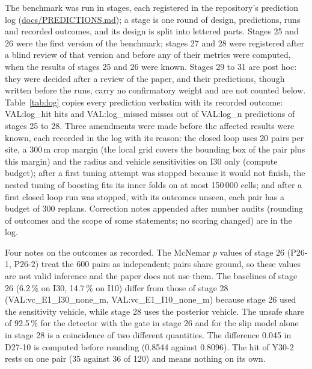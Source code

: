 The benchmark was run in stages, each registered in the repository's prediction log (\url{docs/PREDICTIONS.md}); a stage is one round of design, predictions, runs and recorded outcomes, and its design is split into lettered parts. Stages 25 and 26 were the first version of the benchmark; stages 27 and 28 were registered after a blind review of that version and before any of their metrics were computed, when the results of stages 25 and 26 were known. Stages 29 to 31 are post hoc: they were decided after a review of the paper, and their predictions, though written before the runs, carry no confirmatory weight and are not counted below. Table~\ref{tab:log} copies every prediction verbatim with its recorded outcome: {{VAL:log_hit}} hits and {{VAL:log_missed}} misses out of {{VAL:log_n}} predictions of stages 25 to 28. Three amendments were made before the affected results were known, each recorded in the log with its reason: the closed loop uses 20 pairs per site, a 300\,m crop margin (the local grid covers the bounding box of the pair plus this margin) and the radius and vehicle sensitivities on I30 only (compute budget); after a first tuning attempt was stopped because it would not finish, the nested tuning of boosting fits its inner folds on at most 150\,000 cells; and after a first closed loop run was stopped, with its outcomes unseen, each pair has a budget of 300 replans. Correction notes appended after number audits (rounding of outcomes and the scope of some statements; no scoring changed) are in the log.

Four notes on the outcomes as recorded. The McNemar $p$ values of stage 26 (P26-1, P26-2) treat the 600 pairs as independent; pairs share ground, so these values are not valid inference and the paper does not use them. The baselines of stage 26 (6.2\,\% on I30, 14.7\,\% on I10) differ from those of stage 28 ({{VAL:vc_E1_I30_none_m}}, {{VAL:vc_E1_I10_none_m}}) because stage 26 used the sensitivity vehicle, while stage 28 uses the posterior vehicle. The unsafe share of 92.5\,\% for the detector with the gate in stage 26 and for the slip model alone in stage 28 is a coincidence of two different quantities. The difference 0.045 in D27-10 is computed before rounding (0.8544 against 0.8096). The hit of Y30-2 rests on one pair (35 against 36 of 120) and means nothing on its own.
